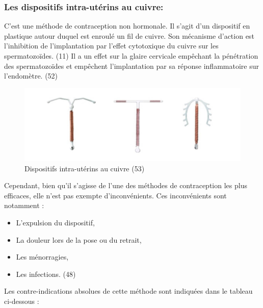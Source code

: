 \subsubsection{Les dispositifs intra-utérins au cuivre:}

\noindent C’est une méthode de contraception non hormonale. Il s’agit d’un dispositif en plastique autour duquel est enroulé un fil de cuivre. Son mécanisme d’action est l’inhibition de l’implantation par l’effet cytotoxique du cuivre sur les spermatozoïdes. (11) Il a un effet sur la glaire cervicale empêchant la pénétration des spermatozoïdes et empêchent l’implantation par sa réponse inflammatoire sur l’endomètre. (52) 

\begin{figure}[H]
  \centering
  \includegraphics[scale=0.4]{Images/fig_25.jpg}
  \caption{Dispositifs intra-utérins au cuivre (53)}
\end{figure}

\noindent Cependant, bien qu’il s’agisse de l’une des méthodes de contraception les plus efficaces, elle n’est pas exempte d’inconvénients. Ces inconvénients sont notamment : 

\begin{itemize}[label={$\bullet$}, align=right]
  \item	L’expulsion du dispositif, 
  \item La douleur lors de la pose ou du retrait, 
  \item	Les ménorragies,
  \item	Les infections. (48)  
\end{itemize}

\noindent Les contre-indications absolues de cette méthode sont indiquées dans le tableau ci-dessous :

